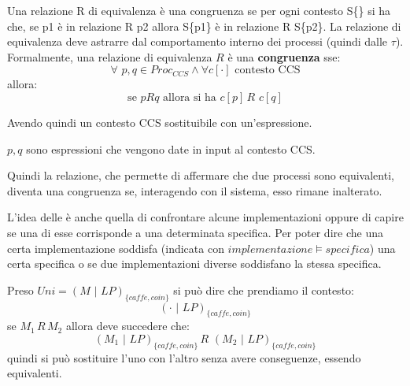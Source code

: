 \begin{definizione}
 Una relazione R di equivalenza è una congruenza se per ogni contesto S\{\} si ha che, se p1 è
in relazione R p2 allora S\{p1\} è in relazione R S\{p2\}. La relazione di equivalenza deve astrarre dal
comportamento interno dei processi (quindi dalle $\tau$).  \\ Formalmente, una relazione di equivalenza $R$ è una \textbf{congruenza} sse:
  \[\forall \,\, p, q\in Proc_{CCS} \land \forall c[\cdot] \mbox{ contesto CCS}\]
  allora:
  \[\mbox{se }pRq\mbox{ allora si ha }c[p]\, R\,\, c[q]\]
  \begin{nota}
  Avendo quindi un contesto CCS sostituibile con un'espressione.
  \end{nota}
    \begin{nota}
      $p,q$ sono espressioni che vengono date in input al contesto CCS.
    \end{nota}
\begin{nota}
  Quindi la relazione, che permette di affermare che due processi sono equivalenti, diventa una congruenza se, interagendo con il sistema, esso rimane inalterato.
\end{nota} 
\end{definizione} \vspace{5mm} %

L'idea delle è anche quella di confrontare alcune implementazioni oppure di capire se una di esse corrisponde a una determinata specifica. Per poter dire che una certa implementazione soddisfa (indicata con
$implementazione \vDash specifica$) una certa
specifica o se due implementazioni diverse soddisfano la stessa specifica.
\begin{esempio}
  Preso $Uni=(M\,\,|\,\, LP)_{\{caffe, coin\}}$ si può dire che prendiamo il contesto:
  \[(\cdot\,\,|\,\, LP)_{\{caffe, coin\}}\]
  se $M_1\, R\, M_2$ allora deve succedere che:
  \[(M_1\,\,|\,\, LP)_{\{caffe, coin\}}\, R\,\,(M_2\,\,|\,\, LP)_{\{caffe, coin\}}\]
  quindi si può sostituire l'uno con l'altro senza avere conseguenze, essendo
  equivalenti.
\end{esempio}
